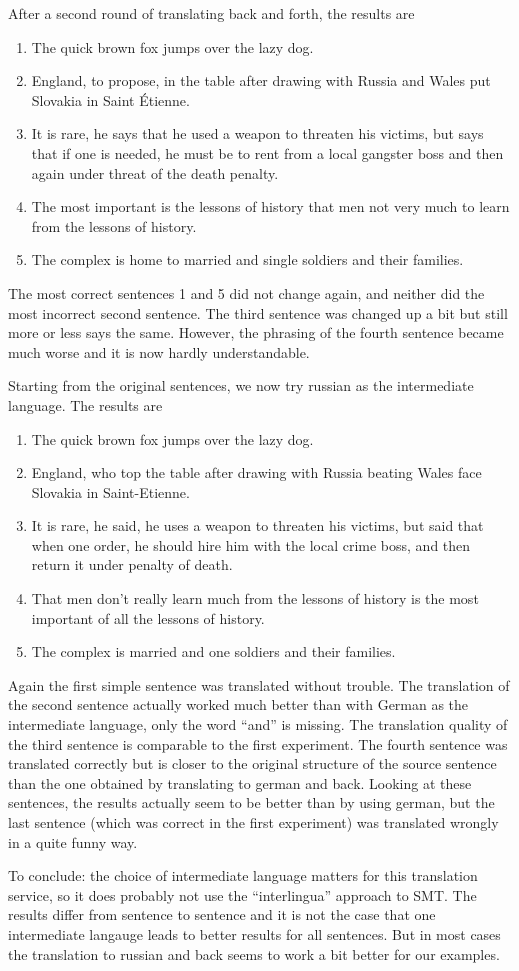 \documentclass[%
   11pt,              %
   ngerman,           %
   a4paper,           %
   DIV11,             %
]{scrartcl}%
\begin{document}
After a second round of translating back and forth, the results are
\begin{enumerate}
	\item The quick brown fox jumps over the lazy dog. 
	\item England, to propose, in the table after drawing with Russia and Wales put Slovakia in Saint Étienne.
	\item It is rare, he says that he used a weapon to threaten his victims, but says that if one is needed, he must be to rent from a local gangster boss and then again under threat of the death penalty.
	\item The most important is the lessons of history that men not very much to learn from the lessons of history.
	\item The complex is home to married and single soldiers and their families.
\end{enumerate}
The most correct sentences 1 and 5 did not change again, and neither did the most incorrect second sentence. The third sentence was changed up a bit but still more or less says the same. However, the phrasing of the fourth sentence became much worse and it is now hardly understandable. \par
Starting from the original sentences, we now try russian as the intermediate language. The results are
\begin{enumerate}
	\item The quick brown fox jumps over the lazy dog. 
	\item England, who top the table after drawing with Russia beating Wales face Slovakia in Saint-Etienne. 
	\item It is rare, he said, he uses a weapon to threaten his victims, but said that when one order, he should hire him with the local crime boss, and then return it under penalty of death. 
	\item That men don't really learn much from the lessons of history is the most important of all the lessons of history. 
	\item The complex is married and one soldiers and their families.
\end{enumerate}
Again the first simple sentence was translated without trouble. The translation of the second sentence actually worked much better than with German as the intermediate language, only the word ``and'' is missing. The translation quality of the third sentence is comparable to the first experiment. The fourth sentence was translated correctly but is closer to the original structure of the source sentence than the one obtained by translating to german and back. Looking at these sentences, the results actually seem to be better than by using german, but the last sentence (which was correct in the first experiment) was translated wrongly in a quite funny way. \par
 To conclude: the choice of intermediate language matters for this translation service, so it does probably not use the ``interlingua'' approach to SMT. The results differ from sentence to sentence and it is not the case that one intermediate langauge leads to better results for all sentences. But in most cases the translation to russian and back seems to work a bit better for our examples.
\end{document}
